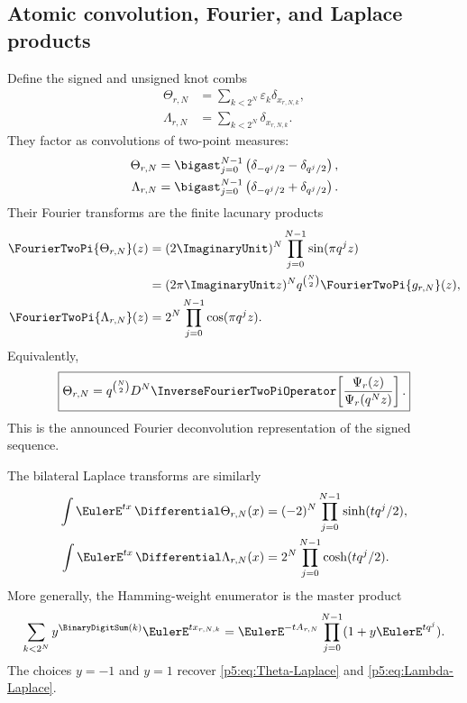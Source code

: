 \documentclass[11pt]{article}
\theoremstyle{definition}
\theoremstyle{remark}
\newcommand{\eps}{\varepsilon}
\begin{document}
\subsection{Atomic convolution, Fourier, and Laplace products}

Define the signed and unsigned knot combs
\begin{align}
 \Theta_{r,N}&=\sum_{k<2^N}\eps_k\delta_{x_{r,N,k}},       \label{p5:eq:Theta-rN}\\
 \Lambda_{r,N}&=\sum_{k<2^N}\delta_{x_{r,N,k}}.           \label{p5:eq:Lambda-rN}
\end{align}
They factor as convolutions of two-point measures:
\begin{align}
 \Theta_{r,N}
 &=\bigast_{j=0}^{N-1}
   \left(\delta_{-q^j/2}-\delta_{q^j/2}\right),           \label{p5:eq:Theta-convolution}\\
 \Lambda_{r,N}
 &=\bigast_{j=0}^{N-1}
   \left(\delta_{-q^j/2}+\delta_{q^j/2}\right).           \label{p5:eq:Lambda-convolution}
\end{align}
Their Fourier transforms are the finite lacunary products
\begin{align}
 \FourierTwoPi{\Theta_{r,N}}(z)
 &=(2\ImaginaryUnit)^N\prod_{j=0}^{N-1}\sin(\pi q^jz)                \label{p5:eq:Theta-Fourier}\\
 &=(2\pi\ImaginaryUnit z)^Nq^{\binom N2}\FourierTwoPi{g_{r,N}}(z),       \label{p5:eq:Theta-Fourier-spline}\\
 \FourierTwoPi{\Lambda_{r,N}}(z)
 &=2^N\prod_{j=0}^{N-1}\cos(\pi q^jz).                   \label{p5:eq:Lambda-Fourier}
\end{align}
Equivalently,
\begin{equation}
 \boxed{\displaystyle
 \Theta_{r,N}=q^{\binom N2}D^N\InverseFourierTwoPiOperator\!\left[
   \frac{\Psi_r(z)}{\Psi_r(q^Nz)}\right].}               \label{p5:eq:TM-Fourier-deconvolution}
\end{equation}
This is the announced Fourier deconvolution representation of the signed
sequence.

The bilateral Laplace transforms are similarly
\begin{align}
 \int\EulerE^{tx}\,\Differential\Theta_{r,N}(x)
 &=(-2)^N\prod_{j=0}^{N-1}\sinh(tq^j/2),                  \label{p5:eq:Theta-Laplace}\\
 \int\EulerE^{tx}\,\Differential\Lambda_{r,N}(x)
 &=2^N\prod_{j=0}^{N-1}\cosh(tq^j/2).                    \label{p5:eq:Lambda-Laplace}
\end{align}
More generally, the Hamming-weight enumerator is the master product
\begin{equation}
 \sum_{k<2^N}y^{\BinaryDigitSum(k)}\EulerE^{t x_{r,N,k}}
 =\EulerE^{-tA_{r,N}}\prod_{j=0}^{N-1}(1+y\EulerE^{tq^j}).          \label{p5:eq:master-knot-enumerator}
\end{equation}
The choices $y=-1$ and $y=1$ recover
\eqref{p5:eq:Theta-Laplace} and \eqref{p5:eq:Lambda-Laplace}.
\end{document}
